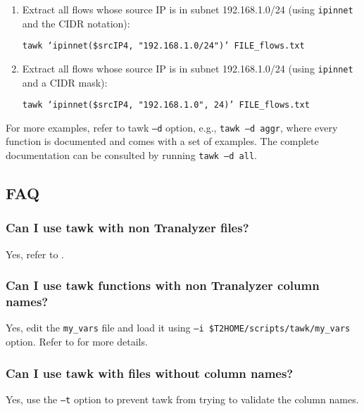 \documentclass[documentation]{subfiles}
\begin{document}
\begin{enumerate}
        \begin{center}{\tt tawk `ipinnet(\$srcIP4, "192.168.1.0", 0xffffff00)' FILE\_flows.txt}\end{center}
    \item Extract all flows whose source IP is in subnet 192.168.1.0/24 (using {\tt ipinnet} and the CIDR notation):
        \begin{center}{\tt tawk `ipinnet(\$srcIP4, "192.168.1.0/24")' FILE\_flows.txt}\end{center}
    \item Extract all flows whose source IP is in subnet 192.168.1.0/24 (using {\tt ipinnet} and a CIDR mask):
        \begin{center}{\tt tawk `ipinnet(\$srcIP4, "192.168.1.0", 24)' FILE\_flows.txt}\end{center}
\end{enumerate}
For more examples, refer to tawk {\tt --d} option, e.g., {\tt tawk --d aggr}, where every function is documented and comes with a set of examples.
The complete documentation can be consulted by running {\tt tawk --d all}.


\subsection{FAQ}

\subsubsection{Can I use tawk with non Tranalyzer files?}
Yes, refer to .

\subsubsection{Can I use tawk functions with non Tranalyzer column names?}
Yes, edit the {\tt my\_vars} file and load it using {\tt --i \$T2HOME/scripts/tawk/my\_vars} option.
Refer to  for more details.

\subsubsection{Can I use tawk with files without column names?}
Yes, use the {\tt --t} option to prevent tawk from trying to validate the column names.
\end{document}

